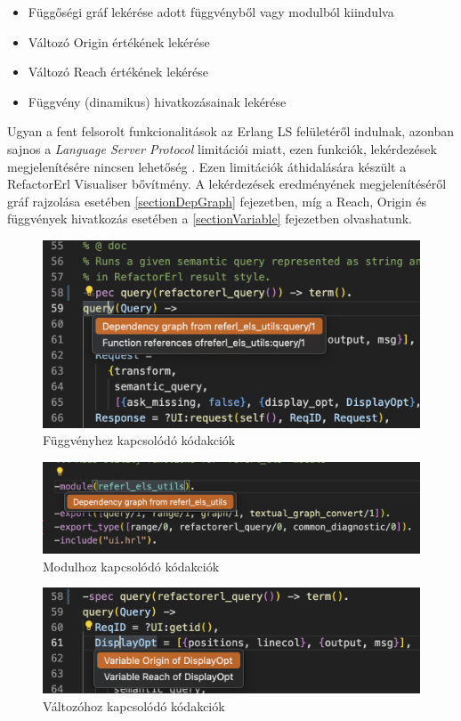 \begin{itemize}
    \item Függőségi gráf lekérése adott függvényből vagy modulból kiindulva
    \item Változó Origin értékének lekérése
    \item Változó Reach értékének lekérése
    \item Függvény (dinamikus) hivatkozásainak lekérése
\end{itemize}


Ugyan a fent felsorolt funkcionalitások az Erlang LS felületéről indulnak, azonban sajnos a \textit{Language Server Protocol} limitációi miatt, ezen funkciók, lekérdezések megjelenítésére nincsen lehetőség \cite{microsoftLSp}. Ezen limitációk áthidalására készült a RefactorErl Visualiser bővítmény. A lekérdezések eredményének megjelenítéséről gráf rajzolása esetében \ref{sectionDepGraph} fejezetben, míg a Reach, Origin és függvények hivatkozás esetében a \ref{sectionVariable} fejezetben olvashatunk.

\begin{figure}[H]
  \centering
  \includegraphics[width=0.7\linewidth]{images/codeact_function.png}
  \caption{Függvényhez kapcsolódó kódakciók}
  \label{fig:codeact_function}
\end{figure}

\begin{figure}[H]
  \centering
  \includegraphics[width=0.7\linewidth]{images/codeact_module.png}
  \caption{Modulhoz kapcsolódó kódakciók}
  \label{fig:codeact_module}
\end{figure}

\begin{figure}[H]
  \centering
  \includegraphics[width=0.7\linewidth]{images/codeact_variable.png}
  \caption{Változóhoz kapcsolódó kódakciók}
  \label{fig:codeact_variable}
\end{figure}

